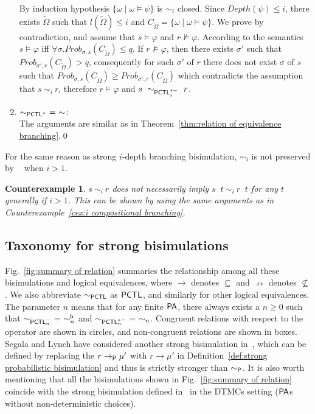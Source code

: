 \documentclass{LMCS}
\def\phi{\varphi}
\DeclareMathOperator{\interleave}{||}
\newtheorem{counter}{Counterexample}
\def\tilde{\widetilde}
\newcommand{\TRAN}[2]{#1\rightarrow #2}
\newcommand{\TRANP}[2]{#1\rightarrow_{{\sf P}}#2}
\newcommand{\BSP}{\ensuremath{\sim_{{\sf P}}}}
\newcommand{\PA}{{\sf PA}}
\newcommand{\PCTL}{{\sf PCTL}}
\newcommand{\iBS}[1]{\sim_{#1}}
\newcommand{\iBSB}[1]{\sim_{#1}^{{\sf b}}}
\newcommand{\EPCTL}{\sim_{\PCTL}}
\newcommand{\iEPCTLM}[1]{\sim_{\PCTL^{-}_{#1}}}
\newcommand{\EPCTLS}{\sim_{\PCTL^{*}}}
\newcommand{\iEPCTLSM}[1]{\sim_{\PCTL_{#1}^{*-}}}
\newcommand{\DEPTH}{\mathit{Depth}}
\newcommand{\MEASURE}{\mathit{Prob}}
\begin{document}
\begin{enumerate}[(1)]
By induction hypothesis $\{\omega\mid\omega\models\psi\}$ is $\iBS{i}$ closed. Since
$\DEPTH(\psi) \leq i$, there exists $\tilde{\Omega}$ such that
$l(\tilde{\Omega})\leq i$ and 
$C_{\tilde{\Omega}}=\{\omega\mid\omega\models\psi\}$.
We prove by contradiction, and assume that $s\models\phi$ and $r\not\models\phi$. According to the semantics $s\models\phi$ iff $\forall\sigma.\MEASURE_{\sigma,s}(C_{\tilde{\Omega}})\leq q$. If $r\not\models\phi$, then there exists $\sigma'$ such that $\MEASURE_{\sigma',r}(C_{\tilde{\Omega}})>q$, consequently for such $\sigma'$ of $r$ there does not exist $\sigma$ of $s$ such that $\MEASURE_{\sigma,s}(C_{\tilde{\Omega}})\geq\MEASURE_{\sigma',r}(C_{\tilde{\Omega}})$ which contradicts the assumption that $s~\iBS{i}~r$, therefore $r\models\phi$ and $s~\iEPCTLSM{i}~r$.
\item $\EPCTLS~=~\iBS{}$:\\
The arguments are similar as in Theorem~\ref{thm:relation of equivalence branching}.\qed
\end{enumerate}




\noindent For the same reason as strong $i$-depth branching bisimulation,  $\iBS{i}$ is not preserved by $\interleave$ when $i>1$.
\begin{counter}\label{cex:i compositional}
$s~\iBS{i}~r$ does not necessarily imply $s\interleave t~\iBS{i}~r\interleave t$ for any $t$ generally if $i>1$.
This can be shown by using the same arguments as in Counterexample~\ref{cex:i compositional branching}.
\end{counter}


\subsection{Taxonomy for strong bisimulations}
Fig.~\ref{fig:summary of relation} summaries the relationship among
all these bisimulations and logical equivalences, where $\rightarrow$
denotes $\subseteq$ and $\nrightarrow$ denotes $\nsubseteq$. We also
abbreviate $\EPCTL$ as $\PCTL$, and similarly for other logical
equivalences. The parameter $n$ means that for any finite $\PA$,
 there always exists a $n\ge 0$
such that $\iEPCTLM{n}~=~\iBSB{n}$ and $\iEPCTLSM{n}~=~\iBS{n}$.
Congruent relations with respect to the $\interleave$
operator are shown in circles, and non-congruent relations are shown
in boxes. Segala and Lynch have considered another strong bisimulation
in~\cite{SegalaL95}, which can be defined by replacing the
$\TRANP{r}{\mu'}$ with $\TRAN{r}{\mu'}$ in Definition~\ref{def:strong
  probabilistic bisimulation} and thus is strictly stronger than
$\BSP$.  It is also worth mentioning that all the bisimulations shown
in Fig.~\ref{fig:summary of relation} coincide with the strong
bisimulation defined in~\cite{BaierKHW05} in the {\sf DTMC}s setting
($\PA$s without non-deterministic choices). 
\end{document}
